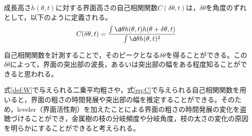 \documentclass[autodetect-engine,dvi=dvipdfmx,a4paper,ja=standard,oneside,openany,11pt,draft]{bxjsbook}
\begin{document}
成長高さ$h(\theta,t)$に対する界面高さの自己相関関数$C(\delta\theta,t)$は，$\delta \theta$を角度のずれとして，以下のように定義される。
\begin{equation}
  C(\delta\theta,t) = \frac{\int \d \theta h(\theta,t)h(\theta+\delta\theta,t)}{\int \d \theta h(\theta,t)^2}
  \label{eq:C}
\end{equation}

自己相関関数を計測することで，そのピークとなる$\delta \theta$を得ることができる。この$\delta \theta$によって，界面の突出部の波長，あるいは突出部の幅をある程度知ることができると思われる。

式\eqref{def:W}で与えられる二乗平均粗さや，式\eqref{eq:C}で与えられる自己相関関数を用いると，界面の粗さの時間発展や突出部の幅を推定することができる。そのため，leveler（界面活性剤）を加えたことによる界面の粗さの時間発展の変化を盗聴づけることができ，金属樹の枝の分岐頻度や分岐角度，枝の太さの変化の原因を明らかにすることができると考えられる。
\ifdraft{
  
  
}{}
\end{document}
